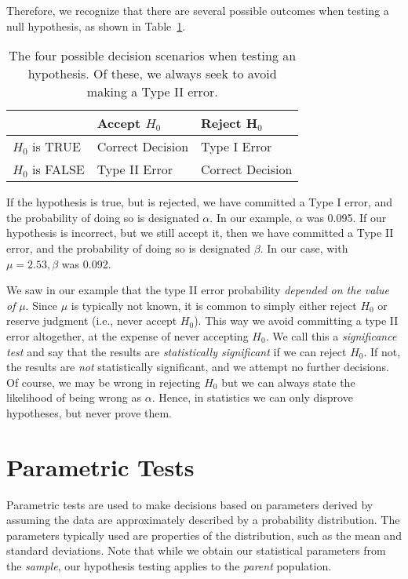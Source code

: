 Therefore, we recognize that there are several possible outcomes when testing a null hypothesis, as
shown in Table~\ref{tbl:typerror}.
\begin{table}[h]
\centering
\begin{tabular}{|l|l|l|} \hline
&  \bf{Accept} $H_0$  & \bf{Reject} H$_{0}$ \\ \hline
$H_0$ is TRUE & Correct Decision & Type I Error \\ \hline
$H_0$ is FALSE & Type II Error & Correct Decision \\ \hline
\end{tabular}
\caption{The four possible decision scenarios when testing an hypothesis.  Of these, we always
seek to avoid making a Type II error.}
\label{tbl:typerror}
\end{table}
If the hypothesis is true, but is rejected, we have committed a Type I error, and the probability of 
doing so is designated $\alpha$.  In our example, $\alpha$ was 0.095.  If our hypothesis is incorrect, but we 
still accept it, then we have committed a Type II error, and the probability of doing so is 
designated $\beta$.  In our case, with $\mu = 2.53, \beta$  was 0.092.

	We saw in our example that the type II error probability \emph{depended on the value of} $\mu$.  Since $\mu$ 
is typically not known, it is common to simply either reject $H_0$ or reserve judgment (i.e., never 
accept $H_0$).  This way we avoid committing a type II error altogether, at the expense of never 
accepting $H_0$.  We call this a \emph{significance test} and say that the results are \emph{statistically significant} 
if we can reject $H_0$.  If not, the results are \emph{not} statistically significant, and we attempt no further 
decisions.  Of course, we may be wrong in rejecting $H_0$ but we can always state the likelihood of being wrong as $\alpha$.
Hence, in statistics we can only disprove hypotheses, but never prove them.

\section{Parametric Tests}

Parametric tests are used to make decisions based on parameters derived by assuming the data are
approximately described by a probability distribution.  The parameters typically used
are properties of the distribution, such as the mean and standard deviations.  Note that while we obtain our statistical parameters
from the \emph{sample}, our hypothesis testing applies to the \emph{parent} population.


